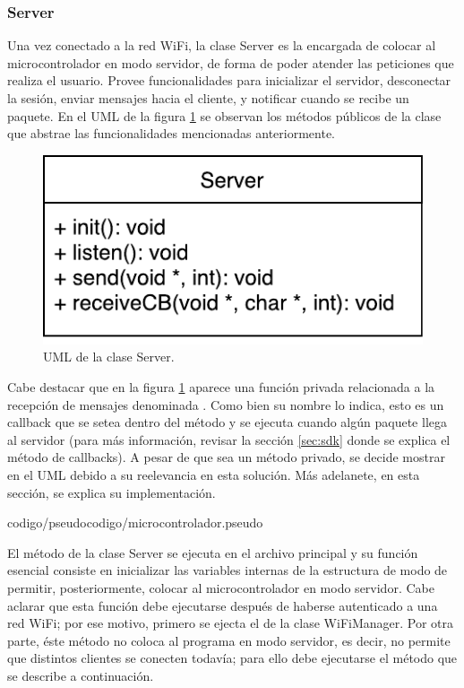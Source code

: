 \subsubsection{Server}

Una vez conectado a la red WiFi, la clase Server es la encargada de colocar al microcontrolador en modo servidor, de forma de poder atender las peticiones que realiza el usuario.
Provee funcionalidades para inicializar el servidor, desconectar la sesión, enviar mensajes hacia el cliente, y notificar cuando se recibe un paquete.
En el UML de la figura \ref{uml:server} se observan los métodos públicos de la clase que abstrae las funcionalidades mencionadas anteriormente.

\begin{figure}[!ht]
	\centering
	\includegraphics[scale=0.8]{imagenes/uml/server.pdf}
	\caption{UML de la clase Server.}
	\label{uml:server}
\end{figure}

Cabe destacar que en la figura \ref{uml:server} aparece una función privada relacionada a la recepción de mensajes denominada .
Como bien su nombre lo indica, esto es un callback que se setea dentro del método  y se ejecuta cuando algún paquete llega al servidor (para más información, revisar la sección \ref{sec:sdk} donde se explica el método de callbacks).
A pesar de que sea un método privado, se decide mostrar en el UML debido a su reelevancia en esta solución.
Más adelanete, en esta sección, se explica su implementación.

 {codigo/pseudocodigo/microcontrolador.pseudo}

El método  de la clase Server se ejecuta en el archivo principal y su función esencial consiste en inicializar las variables internas de la estructura de modo de permitir, posteriormente, colocar al microcontrolador en modo servidor.
Cabe aclarar que esta función debe ejecutarse después de haberse autenticado a una red WiFi; por ese motivo, primero se ejecta el  de la clase WiFiManager.
Por otra parte, éste método no coloca al programa en modo servidor, es decir, no permite que distintos clientes se conecten todavía; para ello debe ejecutarse el método  que se describe a continuación.

